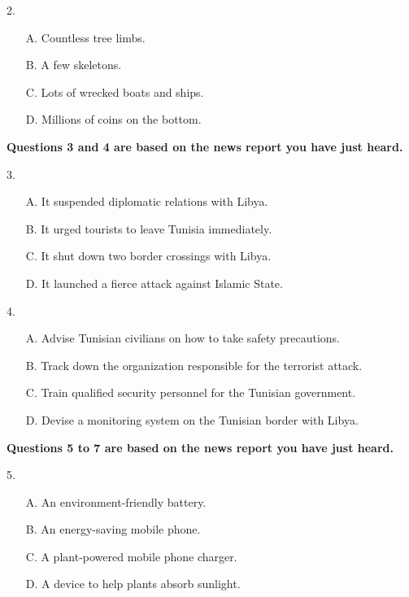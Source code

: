 \documentclass[UTF8,11pt]{ctexart}
\begin{document}
2.


\begin{itemize}[leftmargin=2em,itemsep=.2em,topsep=.4em]\item[A.] Countless tree limbs.
\item[B.] A few skeletons.
\item[C.] Lots of wrecked boats and ships.
\item[D.] Millions of coins on the bottom.
\end{itemize}

\textbf{Questions 3 and 4 are based on the news report you have just heard.}


3.


\begin{itemize}[leftmargin=2em,itemsep=.2em,topsep=.4em]\item[A.] It suspended diplomatic relations with Libya.
\item[B.] It urged tourists to leave Tunisia immediately.
\item[C.] It shut down two border crossings with Libya.
\item[D.] It launched a fierce attack against Islamic State.
\end{itemize}

4.


\begin{itemize}[leftmargin=2em,itemsep=.2em,topsep=.4em]\item[A.] Advise Tunisian civilians on how to take safety precautions.
\item[B.] Track down the organization responsible for the terrorist attack.
\item[C.] Train qualified security personnel for the Tunisian government.
\item[D.] Devise a monitoring system on the Tunisian border with Libya.
\end{itemize}

\textbf{Questions 5 to 7 are based on the news report you have just heard.}


5.


\begin{itemize}[leftmargin=2em,itemsep=.2em,topsep=.4em]\item[A.] An environment-friendly battery.
\item[B.] An energy-saving mobile phone.
\item[C.] A plant-powered mobile phone charger.
\item[D.] A device to help plants absorb sunlight.
\end{itemize}
\end{document}
